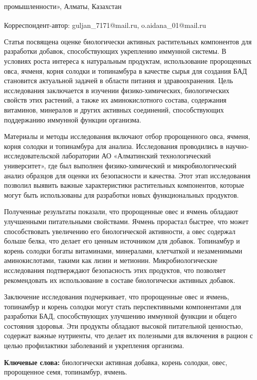 промышленности», Алматы, Казахстан

{\bfseries \textsuperscript{\envelope }}Корреспондент-автор: guljan\_7171@mail.ru,
o.aidana\_01@mail.ru

Статья посвящена оценке биологически активных растительных компонентов
для разработки добавок, способствующих укреплению иммунной системы. В
условиях роста интереса к натуральным продуктам, использование
пророщенных овса, ячменя, корня солодки и топинамбура в качестве сырья
для создания БАД становится актуальной задачей в области питания и
здравоохранения. Цель исследования заключается в изучении
физико-химических, биологических свойств этих растений, а также их
аминокислотного состава, содержания витаминов, минералов и других
активных соединений, способствующих поддержанию иммунной функции
организма.

Материалы и методы исследования включают отбор пророщенного овса,
ячменя, корня солодки и топинамбура для анализа. Исследования
проводились в научно-исследовательской лаборатории АО «Алматинский
технологический университет», где был выполнен физико-химический и
микробиологический анализ образцов для оценки их безопасности и
качества. Этот этап исследования позволил выявить важные характеристики
растительных компонентов, которые могут быть использованы для разработки
новых функциональных продуктов.

Полученные результаты показали, что пророщенные овес и ячмень обладают
улучшенными питательными свойствами. Ячмень прорастал быстрее, что может
способствовать увеличению его биологической активности, а овес содержал
больше белка, что делает его ценным источником для добавок. Топинамбур и
корень солодки богаты витаминами, минералами, клетчаткой и незаменимыми
аминокислотами, такими как лизин и метионин. Микробиологические
исследования подтверждают безопасность этих продуктов, что позволяет
рекомендовать их использование в составе биологически активных добавок.

Заключение исследования подчеркивает, что пророщенные овес и ячмень,
топинамбур и корень солодки могут стать перспективными компонентами для
разработки БАД, способствующих улучшению иммунной функции и общего
состояния здоровья. Эти продукты обладают высокой питательной ценностью,
содержат важные нутриенты, что делает их полезными для включения в
рацион с целью профилактики заболеваний и укрепления организма.

{\bfseries Ключевые слова:} биологически активная добавка, корень солодки,
овес, пророщенное семя, топинамбур, ячмень.


